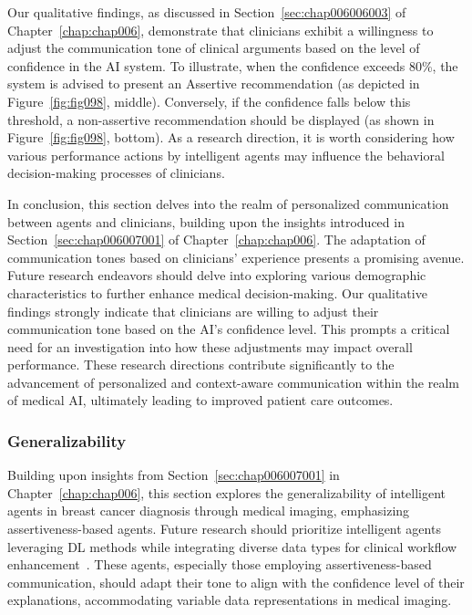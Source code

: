 \textcolor{revised}{Our qualitative findings, as discussed in Section~\ref{sec:chap006006003} of Chapter~\ref{chap:chap006}, demonstrate that clinicians exhibit a willingness to adjust the communication tone of clinical arguments based on the level of confidence in the \ac{AI} system.
To illustrate, when the confidence exceeds 80\%, the system is advised to present an Assertive recommendation (as depicted in Figure~\ref{fig:fig098}, middle).
Conversely, if the confidence falls below this threshold, a non-assertive recommendation should be displayed (as shown in Figure~\ref{fig:fig098}, bottom).
As a research direction, it is worth considering how various performance actions by intelligent agents may influence the behavioral decision-making processes of clinicians.}

\textcolor{revised}{In conclusion, this section delves into the realm of personalized communication between agents and clinicians, building upon the insights introduced in Section~\ref{sec:chap006007001} of Chapter~\ref{chap:chap006}.
The adaptation of communication tones based on clinicians' experience presents a promising avenue.
Future research endeavors should delve into exploring various demographic characteristics to further enhance medical decision-making.
Our qualitative findings strongly indicate that clinicians are willing to adjust their communication tone based on the \ac{AI}'s confidence level.
This prompts a critical need for an investigation into how these adjustments may impact overall performance.
These research directions contribute significantly to the advancement of personalized and context-aware communication within the realm of medical \ac{AI}, ultimately leading to improved patient care outcomes.}

\subsubsection{Generalizability}
\label{sec:app005008001004}

\textcolor{revised}{Building upon insights from Section~\ref{sec:chap006007001} in Chapter~\ref{chap:chap006}, this section explores the generalizability of intelligent agents in breast cancer diagnosis through medical imaging, emphasizing assertiveness-based agents.
Future research should prioritize intelligent agents leveraging \ac{DL} methods while integrating diverse data types for clinical workflow enhancement~\cite{RASMY201811}.
These agents, especially those employing assertiveness-based communication, should adapt their tone to align with the confidence level of their explanations, accommodating variable data representations in medical imaging.}

